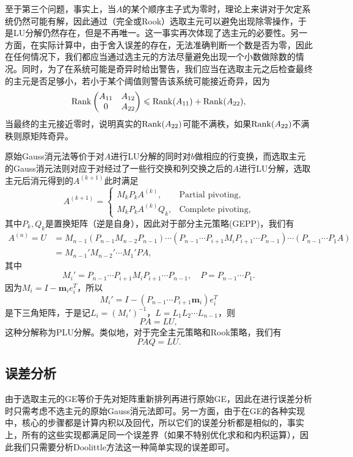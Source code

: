 \documentclass[a4paper,10pt]{ctexart}
\begin{document}
至于第三个问题，事实上，当$ A $的某个顺序主子式为零时，理论上来讲对于欠定系统仍然可能有解，因此通过（完全或Rook）选取主元可以避免出现除零操作，于是LU分解仍然存在，但是不再唯一。这一事实再次体现了选主元的必要性。另一方面，在实际计算中，由于舍入误差的存在，无法准确判断一个数是否为零，因此在任何情况下，我们都应当通过选主元的方法尽量避免出现一个小数做除数的情况。同时，为了在系统可能是奇异时给出警告，我们应当在选取主元之后检查最终的主元是否足够小，若小于某个阈值则警告该系统可能接近奇异，因为
\[
    {\rm Rank} \begin{pmatrix}
        A_{11} & A_{12} \\
        0 & A_{22}
    \end{pmatrix} \leqslant {\rm Rank} (A_{11}) + {\rm Rank} (A_{22}),
\]
当最终的主元接近零时，说明真实的$ {\rm Rank} (A_{22}) $可能不满秩，如果$ {\rm Rank} (A_{22}) $不满秩则原矩阵奇异。

原始Gauss消元法等价于对$ A $进行LU分解的同时对$ b $做相应的行变换，而选取主元的Gauss消元法则对应于对经过了一些行交换和列交换之后的$ A $进行LU分解，选取主元后消元得到的$ A^{(k+1)} $此时满足
\[
    A^{(k+1)} = 
    \begin{cases}
        M_kP_kA^{(k)},& \text{Partial pivoting},\\
        M_kP_kA^{(k)}Q_k,& \text{Complete pivoting},
    \end{cases}
\]
其中$ P_k,Q_k $是置换矩阵（逆是自身），因此对于部分主元策略(GEPP)，我们有
\[
    \begin{aligned}
        A^{(n)} = U 
        &= M_{n-1}(P_{n-1}M_{n-2}P_{n-1})\cdots (P_{n-1}\cdots P_{i+1}M_{i}P_{i+1}\cdots P_{n-1})\cdots (P_{n-1}\cdots P_1A)\\
        &= M_{n-1}'M_{n-2}'\cdots M_1'PA,
    \end{aligned}
\]
其中
\[
    M_{i}' = P_{n-1}\cdots P_{i+1}M_{i}P_{i+1}\cdots P_{n-1},\quad P = P_{n-1}\cdots P_1.
\]
因为$ M_i = I - \bm{m}_i e_i^T $，所以
\[
    M_i' = I - (P_{n-1}\cdots P_{i+1} \bm{m}_i)e_i^T
\]
是下三角矩阵，于是记$ L_i = (M_i')^{-1} $，$ L = L_1 L_2\cdots L_{n-1} $，则
\begin{equation}
    PA = LU,
\end{equation}
这种分解称为PLU分解。类似地，对于完全主元策略和Rook策略，我们有
\begin{equation}
    PAQ = LU.
\end{equation}

\subsection{误差分析}
由于选取主元的GE等价于先对矩阵重新排列再进行原始GE，因此在进行误差分析时只需考虑不选主元的原始Gauss消元法即可。另一方面，由于在GE的各种实现中，核心的步骤都是计算内积以及回代，所以它们的误差分析都是相似的，事实上，所有的这些实现都满足同一个误差界（如果不特别优化求和和内积运算），因此我们只需要分析Doolittle方法这一种简单实现的误差即可。
\end{document}
